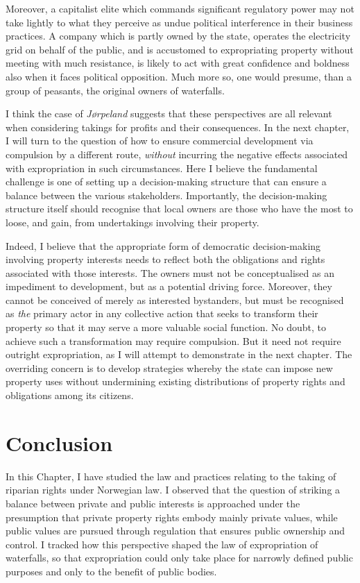 Moreover, a capitalist elite which commands significant regulatory power may not take lightly to what they perceive as undue political interference in their business practices. A company which is partly owned by the state, operates the electricity grid on behalf of the public, and is accustomed to expropriating property without meeting with much resistance, is likely to act with great confidence and boldness also when it faces political opposition. Much more so, one would presume, than a group of peasants, the original owners of waterfalls.

I think the case of \emph{Jørpeland} suggests that these perspectives are all relevant when considering takings for profits and their consequences. In the next chapter, I will turn to the question of how to ensure commercial development via compulsion by a different route, {\it without} incurring the negative effects associated with expropriation in such circumstances. Here I believe the fundamental challenge is one of setting up a decision-making structure that can ensure a balance between the various stakeholders. Importantly, the decision-making structure itself should recognise that local owners are those who have the most to loose, and gain, from undertakings involving their property. 

Indeed, I believe that the appropriate form of democratic decision-making involving property interests needs to reflect both the obligations and rights associated with those interests. The owners must not be conceptualised as an impediment to development, but as a potential driving force. Moreover, they cannot be conceived of merely as interested bystanders, but must be recognised as {\it the} primary actor in any collective action that seeks to transform their property so that it may serve a more valuable social function. No doubt, to achieve such a transformation may require compulsion. But it need not require outright expropriation, as I will attempt to demonstrate in the next chapter. The overriding concern is to develop strategies whereby the state can impose new property uses without undermining existing distributions of property rights and obligations among its citizens.

\section{Conclusion}\label{conc}

In this Chapter, I have studied the law and practices relating to the taking of riparian rights under Norwegian law. I observed that the question of striking a balance between private and public interests is approached under the presumption that private property rights embody mainly private values, while public values are pursued through regulation that ensures public ownership and control. I tracked how this perspective shaped the law of expropriation of waterfalls, so that expropriation could only take place for narrowly defined public purposes and only to the benefit of public bodies.

